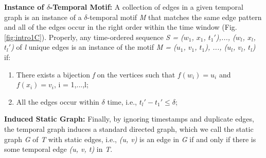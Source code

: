 \documentclass[../../thesis.tex]{subfiles}
\begin{document}
\theoremstyle{definition}
\begin{definition}{\textbf{Instance of $\delta$-Temporal Motif:}}
A collection of edges in a given temporal graph is an instance of a $\delta$-temporal motif \textit{M} that matches the same edge pattern and all of the edges occur in the right order within the time window (Fig. \ref{fig:intro1C}). Properly, any time-ordered sequence \textit{S = ($w_{1}$, $x_{1}$, $t_{1}'$),..., ($w_{l}$, $x_{l}$, $t_{l}'$)} of \textit{l} unique edges is an instance of the motif \textit{M = ($u_{1}$, $v_{1}$, $t_{1}$), ..., ($u_{l}$, $v_{l}$, $t_{l}$)} if:
\begin{enumerate}
  \item {There exists a bijection \textit{f} on the vertices such that \textit{$f(w_{i}) = u_{i}$} and $f(x_{i})=v_{i}$, i = 1,...,l;}
  \item {All the edges occur within  $\delta$ time, i.e., $t_{l}' - t_{1}' \leq \delta$;}
\end{enumerate}

\end{definition}
\label{def:instance_delta_temporal_motif}



\theoremstyle{definition}
\begin{definition}{\textbf{Induced Static Graph:}}
Finally, by ignoring timestamps and duplicate edges, the temporal graph induces a standard directed graph, which we call the static graph \textit{G} of \textit{T} with static edges, i.e., \textit{(u, v)} is an edge in \textit{G} if and only if there is some temporal edge \textit{(u, v, t)} in \textit{T}. 

\end{definition}
\label{def:induced_static_graph}
\end{document}
